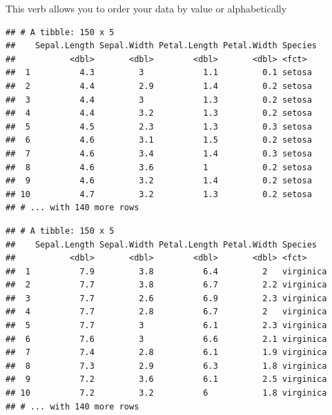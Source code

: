 \documentclass[
]{article}
\newenvironment{Shaded}{\begin{snugshade}}{\end{snugshade}}
\newcommand{\CommentTok}[1]{\textcolor[rgb]{0.56,0.35,0.01}{\textit{#1}}}
\newcommand{\KeywordTok}[1]{\textcolor[rgb]{0.13,0.29,0.53}{\textbf{#1}}}
\newcommand{\NormalTok}[1]{#1}
\newcommand{\OperatorTok}[1]{\textcolor[rgb]{0.81,0.36,0.00}{\textbf{#1}}}
\newcommand{\StringTok}[1]{\textcolor[rgb]{0.31,0.60,0.02}{#1}}
\begin{document}
This verb allows you to order your data by value or alphabetically

\begin{Shaded}
\end{Shaded}

\begin{verbatim}
## # A tibble: 150 x 5
##    Sepal.Length Sepal.Width Petal.Length Petal.Width Species
##           <dbl>       <dbl>        <dbl>       <dbl> <fct>  
##  1          4.3         3            1.1         0.1 setosa 
##  2          4.4         2.9          1.4         0.2 setosa 
##  3          4.4         3            1.3         0.2 setosa 
##  4          4.4         3.2          1.3         0.2 setosa 
##  5          4.5         2.3          1.3         0.3 setosa 
##  6          4.6         3.1          1.5         0.2 setosa 
##  7          4.6         3.4          1.4         0.3 setosa 
##  8          4.6         3.6          1           0.2 setosa 
##  9          4.6         3.2          1.4         0.2 setosa 
## 10          4.7         3.2          1.3         0.2 setosa 
## # ... with 140 more rows
\end{verbatim}

\begin{Shaded}
\end{Shaded}

\begin{verbatim}
## # A tibble: 150 x 5
##    Sepal.Length Sepal.Width Petal.Length Petal.Width Species  
##           <dbl>       <dbl>        <dbl>       <dbl> <fct>    
##  1          7.9         3.8          6.4         2   virginica
##  2          7.7         3.8          6.7         2.2 virginica
##  3          7.7         2.6          6.9         2.3 virginica
##  4          7.7         2.8          6.7         2   virginica
##  5          7.7         3            6.1         2.3 virginica
##  6          7.6         3            6.6         2.1 virginica
##  7          7.4         2.8          6.1         1.9 virginica
##  8          7.3         2.9          6.3         1.8 virginica
##  9          7.2         3.6          6.1         2.5 virginica
## 10          7.2         3.2          6           1.8 virginica
## # ... with 140 more rows
\end{verbatim}
\end{document}
